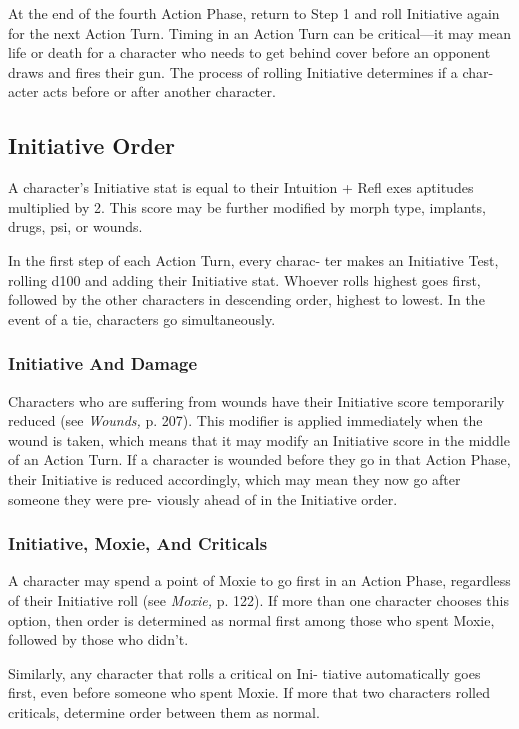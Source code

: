 At the end of the fourth Action Phase, return to Step 
1 and roll Initiative again for the next Action Turn.
Timing in an Action Turn can be critical—it may mean 
life or death for a character who needs to get behind 
cover before an opponent draws and fires their gun. 
The process of rolling Initiative determines if a char-
acter acts before or after another character.

\subsection{Initiative Order}

A character's Initiative stat is equal to their Intuition + 
Refl exes aptitudes multiplied by 2. This score may be 
further modified by morph type, implants, drugs, psi, 
or wounds.

In the first step of each Action Turn, every charac-
ter makes an Initiative Test, rolling d100 and adding 
their Initiative stat. Whoever rolls highest goes first, 
followed by the other characters in descending order, 
highest to lowest. In the event of a tie, characters go 
simultaneously.

\subsubsection{Initiative And Damage}

Characters who are suffering from wounds have their 
Initiative score temporarily reduced (see \textit{Wounds,} p. 
207). This modifier is applied immediately when the 
wound is taken, which means that it may modify an 
Initiative score in the middle of an Action Turn. If a 
character is wounded before they go in that Action 
Phase, their Initiative is reduced accordingly, which 
may mean they now go after someone they were pre-
viously ahead of in the Initiative order.

\subsubsection{Initiative, Moxie, And Criticals}

A character may spend a point of Moxie to go first in 
an Action Phase, regardless of their Initiative roll (see 
\textit{Moxie,} p. 122). If more than one character chooses 
this option, then order is determined as normal first 
among those who spent Moxie, followed by those 
who didn't.

Similarly, any character that rolls a critical on Ini-
tiative automatically goes first, even before someone 
who spent Moxie. If more that two characters rolled 
criticals, determine order between them as normal.

